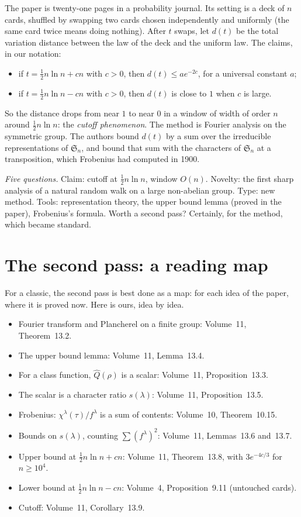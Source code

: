 The paper is twenty-one pages in a probability journal. Its setting is a deck of $n$ cards, shuffled by swapping two cards chosen independently and
uniformly (the same card twice means doing nothing). After $t$ swaps, let $d(t)$ be the total variation distance between the law of the deck and
the uniform law. The claims, in our notation:
\begin{itemize}
\item if $t=\frac12n\ln n+cn$ with $c>0$, then $d(t)\le ae^{-2c}$, for a universal constant $a$;
\item if $t=\frac12n\ln n-cn$ with $c>0$, then $d(t)$ is close to $1$ when $c$ is large.
\end{itemize}
So the distance drops from near $1$ to near $0$ in a window of width of order $n$ around $\frac12n\ln n$: the \emph{cutoff phenomenon}. The method is
Fourier analysis on the symmetric group. The authors bound $d(t)$ by a sum over the irreducible
representations of $\mathfrak S_n$, and bound that sum with the characters of $\mathfrak S_n$ at a transposition, which Frobenius had computed in 1900.

\emph{Five questions.} Claim: cutoff at $\frac12n\ln n$, window $O(n)$. Novelty: the first sharp analysis of a natural random walk on a large
non-abelian group. Type: new method. Tools: representation theory, the upper bound lemma (proved in the paper), Frobenius's formula. Worth a second
pass? Certainly, for the method, which became standard.

\section{The second pass: a reading map}

For a classic, the second pass is best done as a map: for each idea of the paper, where it is proved now. Here is ours, idea by idea.

\begin{itemize}
\item Fourier transform and Plancherel on a finite group: Volume~11, Theorem~13.2.
\item The upper bound lemma: Volume~11, Lemma~13.4.
\item For a class function, $\hat Q(\rho)$ is a scalar: Volume~11, Proposition~13.3.
\item The scalar is a character ratio $s(\lambda)$: Volume~11, Proposition~13.5.
\item Frobenius: $\chi^\lambda(\tau)/f^\lambda$ is a sum of contents: Volume~10, Theorem~10.15.
\item Bounds on $s(\lambda)$, counting $\sum(f^\lambda)^2$: Volume~11, Lemmas~13.6 and~13.7.
\item Upper bound at $\frac12n\ln n+cn$: Volume~11, Theorem~13.8, with $3e^{-4c/3}$ for $n\ge10^4$.
\item Lower bound at $\frac12n\ln n-cn$: Volume~4, Proposition~9.11 (untouched cards).
\item Cutoff: Volume~11, Corollary~13.9.
\end{itemize}

